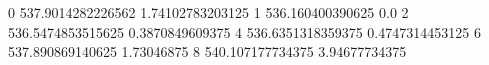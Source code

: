 0 537.9014282226562 1.74102783203125
1 536.160400390625 0.0
2 536.5474853515625 0.3870849609375
4 536.6351318359375 0.4747314453125
6 537.890869140625 1.73046875
8 540.107177734375 3.94677734375
